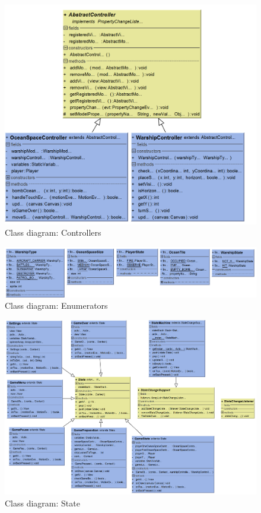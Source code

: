 \begin{figure}[ht]
    \includegraphics[width=\textwidth, angle=90]{img/Class_Controller.png}
    \caption{Class diagram: Controllers}
    \label{fig:DevelopmentView}
\end{figure}

\begin{figure}[ht]
    \includegraphics[width=\textwidth, angle=90]{img/Class_Enums.png}
    \caption{Class diagram: Enumerators}
    \label{fig:DevelopmentView}
\end{figure}

\begin{figure}[ht]
    \includegraphics[width=\textwidth, angle=90]{img/Class_State.png}
    \caption{Class diagram: State}
    \label{fig:DevelopmentView}
\end{figure}

